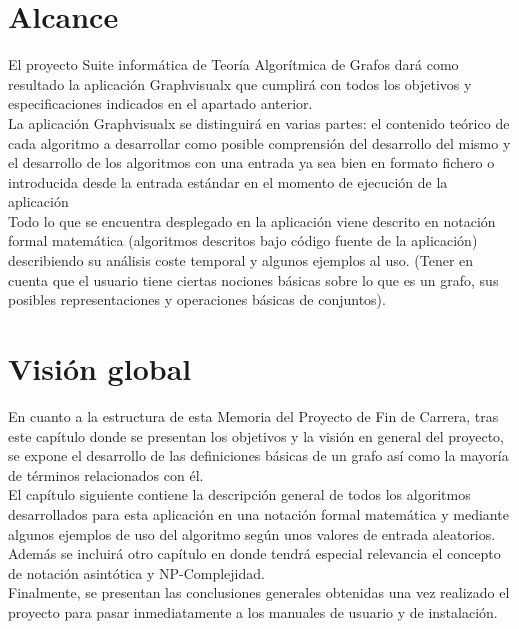 \section{Alcance}

El proyecto Suite informática de Teoría Algorítmica de Grafos dará como resultado la aplicación Graphvisualx que cumplirá con todos los objetivos y especificaciones indicados en el apartado anterior.\\

La aplicación Graphvisualx se distinguirá en varias partes: el contenido teórico de cada algoritmo a desarrollar como posible comprensión del desarrollo del mismo y el desarrollo de los algoritmos con una entrada ya sea bien en formato fichero o introducida desde la entrada estándar en el momento de ejecución de la aplicación\\

Todo lo que se encuentra desplegado en la aplicación viene descrito en notación formal matemática (algoritmos descritos bajo código fuente de la aplicación) describiendo su análisis coste temporal y algunos ejemplos al uso. (Tener en cuenta que el usuario tiene ciertas nociones básicas sobre lo que es un grafo, sus posibles representaciones y operaciones básicas de conjuntos).\\

\section{Visión global}

En cuanto a la estructura de esta Memoria del Proyecto de Fin de Carrera, tras este capítulo donde se presentan los objetivos y la visión en general del proyecto, se expone el desarrollo de las definiciones básicas de un grafo así como la mayoría de términos relacionados con él.\\

El capítulo siguiente contiene la descripción general de todos los algoritmos desarrollados para esta aplicación en una notación formal matemática y mediante algunos ejemplos de uso del algoritmo según unos valores de entrada aleatorios. \\

Además se incluirá otro capítulo en donde tendrá especial relevancia el concepto de notación asintótica y NP-Complejidad. \\

Finalmente, se presentan las conclusiones generales obtenidas una vez realizado el proyecto para pasar inmediatamente a los manuales de usuario y de instalación. \\

